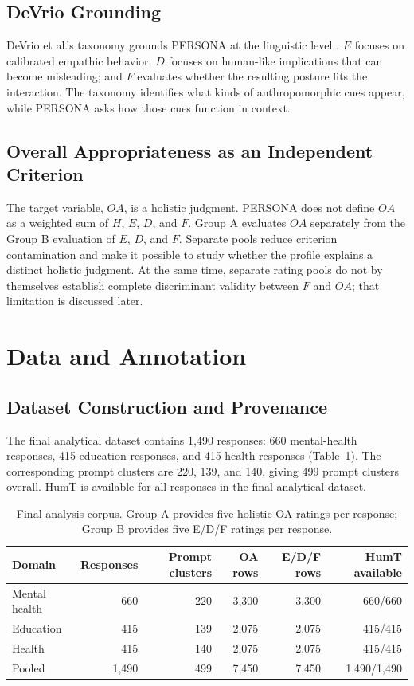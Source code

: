 \documentclass[manuscript,review,anonymous]{acmart}
\begin{document}
\subsection{DeVrio Grounding}

DeVrio et al.'s taxonomy grounds PERSONA at the linguistic level \cite{devrio2025}. $E$ focuses on calibrated empathic behavior; $D$ focuses on human-like implications that can become misleading; and $F$ evaluates whether the resulting posture fits the interaction. The taxonomy identifies what kinds of anthropomorphic cues appear, while PERSONA asks how those cues function in context.

\subsection{Overall Appropriateness as an Independent Criterion}

The target variable, $OA$, is a holistic judgment. PERSONA does not define $OA$ as a weighted sum of $H$, $E$, $D$, and $F$. Group A evaluates $OA$ separately from the Group B evaluation of $E$, $D$, and $F$. Separate pools reduce criterion contamination and make it possible to study whether the profile explains a distinct holistic judgment. At the same time, separate rating pools do not by themselves establish complete discriminant validity between $F$ and $OA$; that limitation is discussed later.

\section{Data and Annotation}

\subsection{Dataset Construction and Provenance}

The final analytical dataset contains 1,490 responses: 660 mental-health responses, 415 education responses, and 415 health responses (Table~\ref{tab:dataset}). The corresponding prompt clusters are 220, 139, and 140, giving 499 prompt clusters overall. HumT is available for all responses in the final analytical dataset.

\begin{table}[t]
\centering
\caption{Final analysis corpus. Group A provides five holistic OA ratings per response; Group B provides five E/D/F ratings per response.}
\label{tab:dataset}
\begin{tabular}{lrrrrr}
\toprule
Domain & Responses & Prompt clusters & OA rows & E/D/F rows & HumT available\\
\midrule
Mental health & 660 & 220 & 3,300 & 3,300 & 660/660\\
Education & 415 & 139 & 2,075 & 2,075 & 415/415\\
Health & 415 & 140 & 2,075 & 2,075 & 415/415\\
\midrule
Pooled & 1,490 & 499 & 7,450 & 7,450 & 1,490/1,490\\
\bottomrule
\end{tabular}
\end{table}
\end{document}
